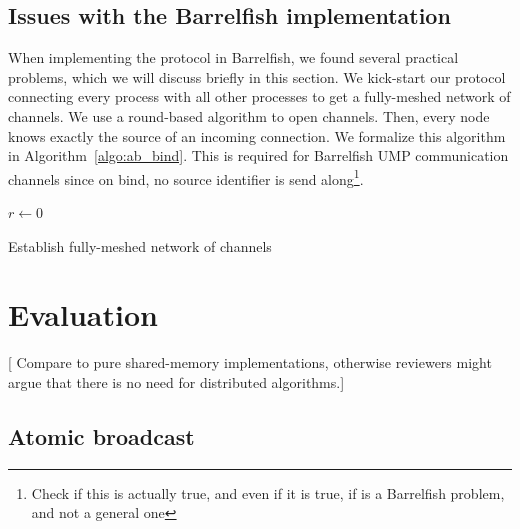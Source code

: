 \documentclass{article}
\newcommand{\stefan}[1]{
  {\color{skRed}[{\color{red}{SK}} #1]}}
\begin{document}
\subsection{Issues with the Barrelfish implementation}

When implementing the protocol in Barrelfish, we found several
practical problems, which we will discuss briefly in this section.
We kick-start our protocol connecting every process with all other
processes to get a fully-meshed network of channels.
We use a round-based algorithm to open channels. Then, every node
knows exactly the source of an incoming connection. We formalize this
algorithm in Algorithm~\ref{algo:ab_bind}.
This is required for Barrelfish UMP communication channels since on
bind, no source identifier is send along\footnote{Check if this is
  actually true, and even if it is true, if is a Barrelfish problem,
  and not a general one}.

\begin{algorithm}[htb]
  \BlankLine
  \BlankLine
  $r \leftarrow 0$\;
  \caption{Establish fully-meshed network of channels}
  \label{algo:ab_bind}
\end{algorithm}

\section{Evaluation}

\stefan{Compare to pure shared-memory implementations, otherwise
  reviewers might argue that there is no need for distributed
  algorithms.}

\subsection{Atomic broadcast}
\end{document}
